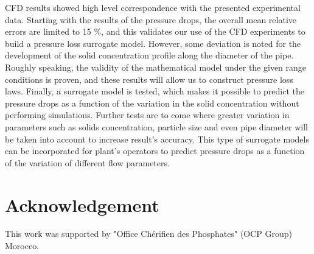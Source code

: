 \documentclass[review,3p,times,12pt]{elsarticle}
\begin{document}
CFD results showed high level correspondence with the presented  experimental data. Starting with the results of the pressure drops, the overall mean relative errors are limited to 15 $ \% $, and this validates our use of the CFD experiments to build a pressure loss surrogate model. However, some deviation is noted for the development of the solid concentration profile along the diameter of the pipe. Roughly speaking, the validity of the mathematical model under the given range conditions is proven, and these results will allow us to construct pressure loss laws. 
Finally, a surrogate model is tested, which makes it possible to predict the pressure drops as a function of the variation in the solid concentration without performing simulations. Further tests are to come where greater variation in parameters such as solids concentration, particle size and even pipe diameter will be taken into account to increase result's accuracy. This type of surrogate models can be incorporated for plant's operators to predict pressure drops as a function of the variation of different flow parameters.




\section*{Acknowledgement} This work was supported by "Office Chérifien des Phosphates" (OCP Group) Morocco.












\end{document}
